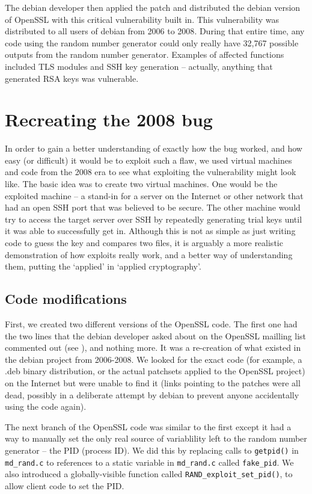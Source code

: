 \documentclass[conference]{IEEEtran}
\begin{document}
The debian developer then applied the patch and distributed the debian
version of OpenSSL with this critical vulnerability built in. This
vulnerability was distributed to all users of debian from 2006 to
2008\cite{1}. During that entire time, any code using the random
number generator could only really have 32,767 possible outputs from
the random number generator. Examples of affected functions included
TLS modules and SSH key generation -- actually, anything that
generated RSA keys was vulnerable.

\section{Recreating the 2008 bug}

In order to gain a better understanding of exactly how the bug worked,
and how easy (or difficult) it would be to exploit such a flaw, we
used virtual machines and code from the 2008 era to see what
exploiting the vulnerability might look like. The basic idea was to
create two virtual machines. One would be the exploited machine -- a
stand-in for a server on the Internet or other network that had an
open SSH port that was believed to be secure. The other machine would
try to access the target server over SSH by repeatedly generating
trial keys until it was able to successfully get in. Although this is
not as simple as just writing code to guess the key and compares two
files, it is arguably a more realistic demonstration of how exploits
really work, and a better way of understanding them, putting the
`applied' in `applied cryptography'.

\subsection{Code modifications}
First, we created two different versions of the OpenSSL code. The
first one had the two lines that the debian developer asked about on
the OpenSSL mailling list commented out (see \cite{4}), and nothing
more. It was a re-creation of what existed in the debian project from
2006-2008. We looked for the exact code (for example, a .deb binary
distribution, or the actual patchsets applied to the OpenSSL project)
on the Internet but were unable to find it (links pointing to the
patches were all dead, possibly in a deliberate attempt by debian to prevent
anyone accidentally using the code again).

The next branch of the OpenSSL code was similar to the first except it
had a way to manually set the only real source of variablility left to
the random number generator -- the PID (process ID). We did this by
replacing calls to \verb|getpid()| in \verb|md_rand.c| to references
to a static variable in \verb|md_rand.c| called \verb|fake_pid|. We
also introduced a globally-visible function called
\verb|RAND_exploit_set_pid()|, to allow client code to set the PID.
\end{document}
